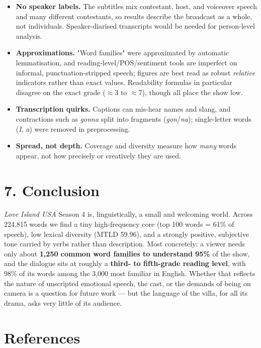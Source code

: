 \documentclass[11pt]{article}
\begin{document}
\begin{itemize}
\item \textbf{No speaker labels.} The subtitles mix contestant, host, and voiceover speech and many different contestants, so results describe the broadcast as a whole, not individuals. Speaker-diarised transcripts would be needed for person-level analysis.
\item \textbf{Approximations.} "Word families" were approximated by automatic lemmatisation, and reading-level/POS/sentiment tools are imperfect on informal, punctuation-stripped speech; figures are best read as robust \emph{relative} indicators rather than exact values. Readability formulas in particular disagree on the exact grade ($\approx$3 to $\approx$7), though all place the show low.
\item \textbf{Transcription quirks.} Captions can mis-hear names and slang, and contractions such as \emph{gonna} split into fragments (\emph{gon}/\emph{na}); single-letter words (\emph{I}, \emph{a}) were removed in preprocessing.
\item \textbf{Spread, not depth.} Coverage and diversity measure how \emph{many} words appear, not how precisely or creatively they are used.
\end{itemize}


\section*{7. Conclusion}

\emph{Love Island USA} Season 4 is, linguistically, a small and welcoming world. Across 224,815 words we find a tiny high-frequency core (top 100 words = 61\% of speech), low lexical diversity (MTLD 59.96), and a strongly positive, subjective tone carried by verbs rather than description. Most concretely: a viewer needs only about \textbf{1,250 common word families to understand 95\%} of the show, and the dialogue sits at roughly a \textbf{third- to fifth-grade reading level}, with 98\% of its words among the 3,000 most familiar in English. Whether that reflects the nature of unscripted emotional speech, the cast, or the demands of being on camera is a question for future work --- but the language of the villa, for all its drama, asks very little of its audience.


\FloatBarrier
\section*{References}
\end{document}
